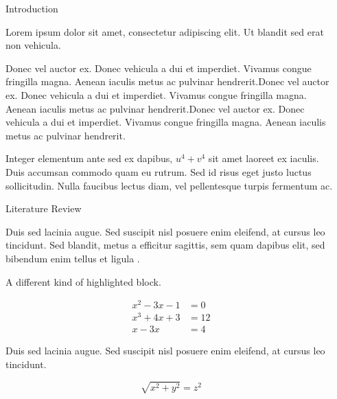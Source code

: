 \documentclass[final]{beamer}
\newlength{\sepwidth}
\newlength{\colwidth}
\newcommand{\separatorcolumn}{\begin{column}{\sepwidth}\end{column}}
\begin{document}
\begin{frame}[t]
\begin{columns}[t]
\separatorcolumn

\begin{column}{\colwidth}


\begin{block}{Introduction}

    Lorem ipsum dolor sit amet, consectetur adipiscing elit. Ut blandit sed erat non vehicula. 

    Donec vel auctor ex. Donec vehicula a dui et imperdiet. Vivamus congue fringilla magna. Aenean iaculis metus ac pulvinar hendrerit.Donec vel auctor ex. Donec vehicula a dui et imperdiet. Vivamus congue fringilla magna. Aenean iaculis metus ac pulvinar hendrerit.Donec vel auctor ex. Donec vehicula a dui et imperdiet. Vivamus congue fringilla magna. Aenean iaculis metus ac pulvinar hendrerit.


    Integer elementum ante sed ex dapibus,  $u^4 + v^4$ sit amet laoreet ex iaculis. Duis accumsan commodo quam eu rutrum. Sed id risus eget justo luctus sollicitudin. Nulla faucibus lectus diam, vel pellentesque turpis fermentum ac.

\end{block}


\begin{block}{Literature Review}

    Duis sed lacinia augue. Sed suscipit nisl posuere enim eleifend, at cursus leo tincidunt. Sed blandit, metus a efficitur sagittis, sem quam dapibus elit, sed bibendum enim tellus et ligula \cite{li-1984}.

    A different kind of highlighted block.

    \begin{align*}
	x^2 - 3x -1 &= 0 \\
	x^3 + 4x + 3 &= 12 \\
	x - 3x &= 4 
    \end{align*}

    Duis sed lacinia augue. Sed suscipit nisl posuere enim eleifend, at cursus leo tincidunt.
    
    \begin{equation}
	\sqrt{x^2 + y^2} = z^2
    \end{equation}


\end{block}
\end{column}
\end{columns}
\end{frame}
\end{document}
